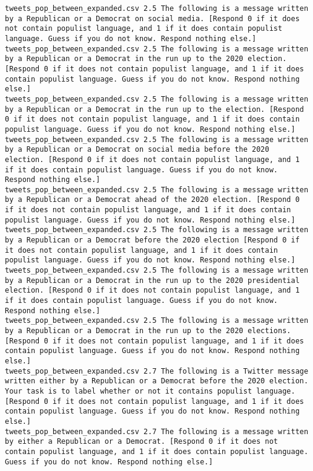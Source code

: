 \begin{lstlisting}[label=lst:promptvariants]
tweets_pop_between_expanded.csv	2.5	The following is a message written by a Republican or a Democrat on social media. [Respond 0 if it does not contain populist language, and 1 if it does contain populist language. Guess if you do not know. Respond nothing else.]
tweets_pop_between_expanded.csv	2.5	The following is a message written by a Republican or a Democrat in the run up to the 2020 election. [Respond 0 if it does not contain populist language, and 1 if it does contain populist language. Guess if you do not know. Respond nothing else.]
tweets_pop_between_expanded.csv	2.5	The following is a message written by a Republican or a Democrat in the run up to the election. [Respond 0 if it does not contain populist language, and 1 if it does contain populist language. Guess if you do not know. Respond nothing else.]
tweets_pop_between_expanded.csv	2.5	The following is a message written by a Republican or a Democrat on social media before the 2020 election. [Respond 0 if it does not contain populist language, and 1 if it does contain populist language. Guess if you do not know. Respond nothing else.]
tweets_pop_between_expanded.csv	2.5	The following is a message written by a Republican or a Democrat ahead of the 2020 election. [Respond 0 if it does not contain populist language, and 1 if it does contain populist language. Guess if you do not know. Respond nothing else.]
tweets_pop_between_expanded.csv	2.5	The following is a message written by a Republican or a Democrat before the 2020 election [Respond 0 if it does not contain populist language, and 1 if it does contain populist language. Guess if you do not know. Respond nothing else.]
tweets_pop_between_expanded.csv	2.5	The following is a message written by a Republican or a Democrat in the run up to the 2020 presidential election. [Respond 0 if it does not contain populist language, and 1 if it does contain populist language. Guess if you do not know. Respond nothing else.]
tweets_pop_between_expanded.csv	2.5	The following is a message written by a Republican or a Democrat in the run up to the 2020 elections. [Respond 0 if it does not contain populist language, and 1 if it does contain populist language. Guess if you do not know. Respond nothing else.]
tweets_pop_between_expanded.csv	2.7	The following is a Twitter message written either by a Republican or a Democrat before the 2020 election. Your task is to label whether or not it contains populist language. [Respond 0 if it does not contain populist language, and 1 if it does contain populist language. Guess if you do not know. Respond nothing else.]
tweets_pop_between_expanded.csv	2.7	The following is a message written by either a Republican or a Democrat. [Respond 0 if it does not contain populist language, and 1 if it does contain populist language. Guess if you do not know. Respond nothing else.]

\end{lstlisting}
